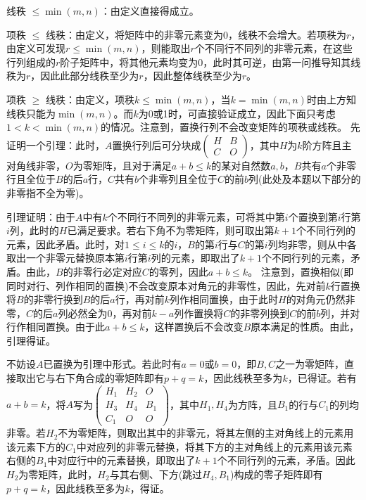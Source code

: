 \documentclass[a4paper,UTF8,fontset=windows]{ctexart}
\begin{document}
\begin{enumerate}
线秩 $\le\min(m,n)$：由定义直接得成立。

项秩 $\le$ 线秩：由定义，将矩阵中的非零元素变为0，线秩不会增大。若项秩为$r$，由定义可发现$r\le\min(m,n)$，则能取出$r$个不同行不同列的非零元素，在这些行列组成的$r$阶子矩阵中，将其他元素均变为0，此时其可逆，由第一问推导知其线秩为$r$，因此此部分线秩至少为$r$，因此整体线秩至少为$r$。

项秩 $\ge$ 线秩：由定义，项秩$k\le\min(m,n)$，当$k=\min(m,n)$时由上方知线秩只能为$\min(m,n)$。而$k$为0或1时，可直接验证成立，因此下面只考虑$1<k<\min(m,n)$的情况。注意到，置换行列不会改变矩阵的项秩或线秩。
先证明一个引理：此时，$A$置换行列后可分块成$\begin{pmatrix}H&B\\C&O\end{pmatrix}$，其中$H$为$k$阶方阵且主对角线非零，$O$为零矩阵，且对于满足$a+b\le k$的某对自然数$a,b$，$B$共有$a$个非零行且全位于$B$的后$a$行，$C$共有$b$个非零列且全位于$C$的前$b$列(此处及本题以下部分的非零指不全为零)。

引理证明：由于$A$中有$k$个不同行不同列的非零元素，可将其中第$i$个置换到第$i$行第$i$列，此时的$H$已满足要求。若右下角不为零矩阵，则可取出第$k+1$个不同行列的元素，因此矛盾。此时，对$1\le i\le k$的$i$，$B$的第$i$行与$C$的第$i$列均非零，则从中各取出一个非零元替换原本第$i$行第$i$列的元素，即取出了$k+1$个不同行列的元素，矛盾。由此，$B$的非零行必定对应$C$的零列，因此$a+b\le k$。 注意到，置换相似(即同时对行、列作相同的置换)不会改变原本对角元的非零性，因此，先对前$k$行置换将$B$的非零行换到$B$的后$a$行，再对前$k$列作相同置换，由于此时$H$的对角元仍然非零，$C$的后$a$列必然全为0，再对前$k-a$列作置换将$C$的非零列换到$C$的前$b$列，并对行作相同置换。由于此$a+b\le k$，这样置换后不会改变$B$原本满足的性质。由此，引理得证。

不妨设$A$已置换为引理中形式。若此时有$a=0$或$b=0$，即$B,C$之一为零矩阵，直接取出它与右下角合成的零矩阵即有$p+q=k$，因此线秩至多为$k$，已得证。若有$a+b=k$，将$A$写为$\begin{pmatrix}H_1&H_2&O\\H_3&H_4&B_1\\C_1&O&O\end{pmatrix}$，其中$H_1,H_4$为方阵，且$B_1$的行与$C_1$的列均非零。若$H_2$不为零矩阵，则取出其中的非零元，将其左侧的主对角线上的元素用该元素下方的$C_1$中对应列的非零元替换，将其下方的主对角线上的元素用该元素右侧的$B_1$中对应行中的元素替换，即取出了$k+1$个不同行列的元素，矛盾。因此$H_2$为零矩阵，此时，$H_2$与其右侧、下方(跳过$H_4,B_1$)构成的零子矩阵即有$p+q=k$，因此线秩至多为$k$，得证。


\end{enumerate}
\end{document}
